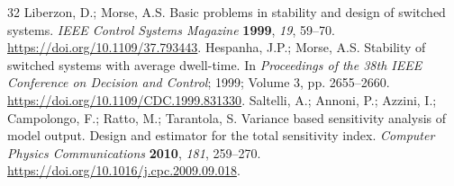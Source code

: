 \begin{thebibliography}{32}
 Liberzon, D.; Morse, A.S. Basic problems in stability and design of switched systems. \emph{IEEE Control Systems Magazine} \textbf{1999}, \emph{19}, 59--70. \url{https://doi.org/10.1109/37.793443}.
 Hespanha, J.P.; Morse, A.S. Stability of switched systems with average dwell-time. In \emph{Proceedings of the 38th IEEE Conference on Decision and Control}; 1999; Volume 3, pp. 2655--2660. \url{https://doi.org/10.1109/CDC.1999.831330}.
 Saltelli, A.; Annoni, P.; Azzini, I.; Campolongo, F.; Ratto, M.; Tarantola, S. Variance based sensitivity analysis of model output. Design and estimator for the total sensitivity index. \emph{Computer Physics Communications} \textbf{2010}, \emph{181}, 259--270. \url{https://doi.org/10.1016/j.cpc.2009.09.018}.
\end{thebibliography}
